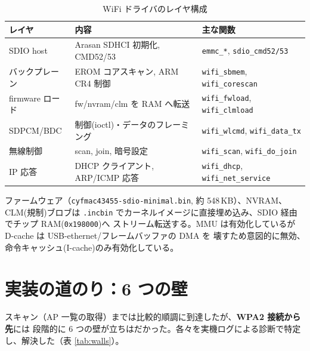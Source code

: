 \documentclass[a4paper,11pt]{ltjsarticle}
\begin{document}
\begin{table}[h]
\centering
\caption{WiFi ドライバのレイヤ構成}
\label{tab:layers}
\small
\begin{tabular}{@{}lll@{}}
\toprule
レイヤ & 内容 & 主な関数 \\
\midrule
SDIO host & Arasan SDHCI 初期化, CMD52/53 & \texttt{emmc\_*}, \texttt{sdio\_cmd52/53} \\
バックプレーン & EROM コアスキャン, ARM CR4 制御 & \texttt{wifi\_sbmem}, \texttt{wifi\_corescan} \\
firmware ロード & fw/nvram/clm を RAM へ転送 & \texttt{wifi\_fwload}, \texttt{wifi\_clmload} \\
SDPCM/BDC & 制御(ioctl)・データのフレーミング & \texttt{wifi\_wlcmd}, \texttt{wifi\_data\_tx} \\
無線制御 & scan, join, 暗号設定 & \texttt{wifi\_scan}, \texttt{wifi\_do\_join} \\
IP 応答 & DHCP クライアント, ARP/ICMP 応答 & \texttt{wifi\_dhcp}, \texttt{wifi\_net\_service} \\
\bottomrule
\end{tabular}
\end{table}

ファームウェア（\texttt{cyfmac43455-sdio-minimal.bin}, 約 548\,KB）、NVRAM、CLM(規制)ブロブは
\texttt{.incbin} でカーネルイメージに直接埋め込み、SDIO 経由でチップ RAM(\texttt{0x198000})へ
ストリーム転送する。MMU は有効化しているが D-cache は USB-ethernet/フレームバッファの DMA を
壊すため意図的に無効、命令キャッシュ(I-cache)のみ有効化している。

\section{実装の道のり：6 つの壁}
スキャン（AP 一覧の取得）までは比較的順調に到達したが、\textbf{WPA2 接続から先}には
段階的に 6 つの壁が立ちはだかった。各々を実機ログによる診断で特定し、解決した（表 \ref{tab:walls}）。
\end{document}
